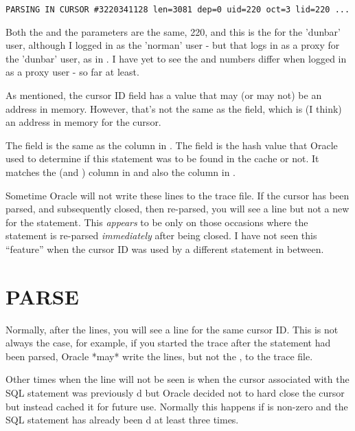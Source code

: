 \begin{lstlisting}[numbers=none,caption={Parsing In Cursor Line - Proxy User}]
PARSING IN CURSOR #3220341128 len=3081 dep=0 uid=220 oct=3 lid=220 ...
\end{lstlisting}

Both the  and the  parameters are the same, 220, and this is the  for the 'dunbar' user, although I logged in as the 'norman' user - but that logs in as a proxy for the 'dunbar' user, as in . I have yet to see the  and  numbers differ when logged in as a proxy user - so far at least.


As mentioned, the cursor ID field has a value that may (or may not) be an address in memory. However, that's not the same as the  field, which is (I think) an address in memory for the cursor.

The  field is the same as the  column in . The  field is the hash value that Oracle used to determine if this statement was to be found in the cache or not. It matches the  (and ) column in  and also the  column in .

Sometime Oracle will not write these lines to the trace file. If the cursor has been parsed, and subsequently closed, then re-parsed, you will see a  line but not a new  for the statement. This \emph{appears} to be only on those occasions where the statement is re-parsed \emph{immediately} after being closed. I have not seen this ``feature'' when the cursor ID was used by a different statement in between.

\newpage\section{PARSE}\label{parse}

Normally, after the  lines, you will see a  line for the same cursor ID. This is not always the case, for example, if you started the trace after the statement had been parsed, Oracle *may* write the  lines, but not the , to the trace file.

Other times when the  line will not be seen is when the cursor associated with the SQL statement was previously d but Oracle decided not to hard close the cursor but instead cached it for future use. Normally this happens if  is non-zero and the SQL statement has already been d at least three times.


